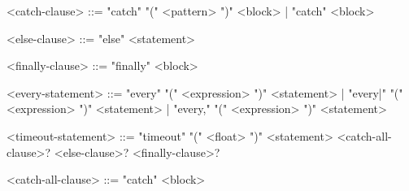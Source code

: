 \begin{bnf}
<catch-clause>
  ::= "catch" "(" <pattern> ")" <block>
    | "catch" <block>

<else-clause>
  ::= "else" <statement>

<finally-clause>
  ::= "finally" <block>


<every-statement>
  ::= "every"  "(" <expression> ")" <statement>
    | "every|" "(" <expression> ")" <statement>
    | "every," "(" <expression> ")" <statement>


<timeout-statement>
::= "timeout" "(" <float> ")" <statement> <catch-all-clause>? <else-clause>? <finally-clause>?

<catch-all-clause>
  ::= "catch" <block>
\end{bnf}

